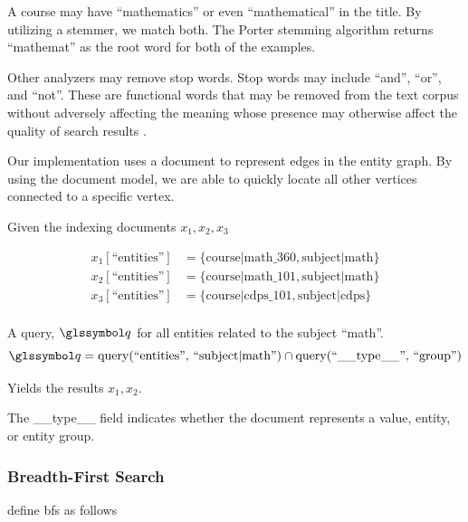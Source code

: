 			\begin{ex}
				A course may have ``mathematics'' or even ``mathematical'' in the title.  By utilizing a stemmer, we match both.  The Porter stemming algorithm returns ``mathemat'' as the root word for both of the examples.
			\end{ex}
			
			Other analyzers may remove stop words.  Stop words may include ``and'', ``or'', and ``not''.  These are functional words that may be removed from the text corpus without adversely affecting the meaning whose presence may otherwise affect the quality of search results \cite{silva-03}.
			
			Our implementation uses a document to represent edges in the entity graph.  By using the document model, we are able to quickly locate all other vertices connected to a specific vertex.
			
			\begin{ex}
				Given the indexing documents \(x_1, x_2, x_3\)
				
				\begin{align*}
					x_1[\text{``entities''}] &= \{\text{course|math\_360}, \text{subject|math}\} \\
					x_2[\text{``entities''}] &= \{\text{course|math\_101}, \text{subject|math}\} \\
					x_3[\text{``entities''}] &= \{\text{course|cdps\_101}, \text{subject|cdps}\} \\
				\end{align*}
				
				A query, \(\q\) for all entities related to the subject ``math''.
				\[
					\q = \query(\text{``entities'', ``subject|math''}) \cap \query(\text{``\_\_type\_\_'', ``group''})
				\]
				
				Yields the results \(x_1, x_2\).
			\end{ex}
			
			\begin{remark}
				The \_\_type\_\_ field indicates whether the document represents a value, entity, or entity group.
			\end{remark}
		
		\subsubsection{Breadth-First Search}
			\citeauthor*{cormen-09} define \gls{bfs} as follows
			
